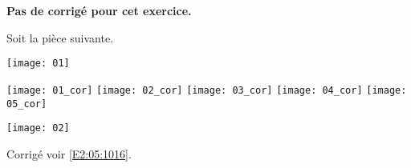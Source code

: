 \normaltrue \difficilefalse \tdifficilefalse
\correctionfalse


\setcounter{numques}{0}

\ifcorrection
\else
\textbf{Pas de corrigé pour cet exercice.}
\fi


\ifprof 
\else
Soit la pièce suivante.
\begin{center}
\texttt{[image: 01]}
\end{center}
 \fi
 
\ifprof
\begin{center}
\texttt{[image: 01\_cor]}
\texttt{[image: 02\_cor]}
\texttt{[image: 03\_cor]}
\texttt{[image: 04\_cor]}
\texttt{[image: 05\_cor]}
\end{center}
\else 
\begin{center}
\texttt{[image: 02]}
\end{center}
\fi

\ifprof
\else
\begin{flushright}
\footnotesize{Corrigé  voir \ref{E2:05:1016}.}
\end{flushright}%
\fi